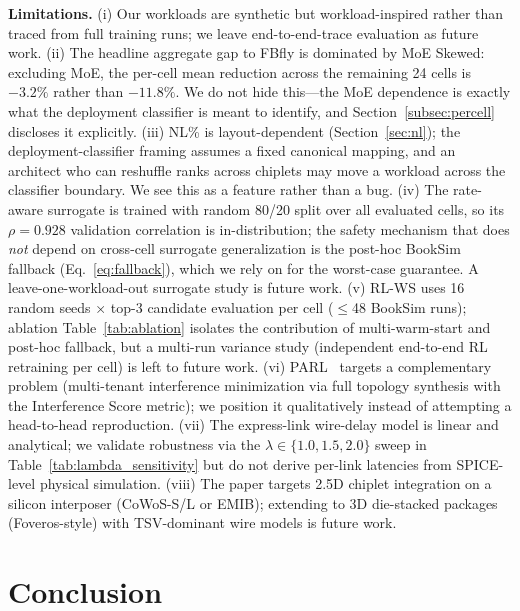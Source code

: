 \documentclass[conference]{IEEEtran}
\begin{document}
\textbf{Limitations.} (i) Our workloads are synthetic but workload-inspired rather than traced from full training runs; we leave end-to-end-trace evaluation as future work. (ii) The headline aggregate gap to FBfly is dominated by MoE Skewed: excluding MoE, the per-cell mean reduction across the remaining 24 cells is $-3.2\%$ rather than $-11.8\%$. We do not hide this---the MoE dependence is exactly what the deployment classifier is meant to identify, and Section~\ref{subsec:percell} discloses it explicitly. (iii) NL\% is layout-dependent (Section~\ref{sec:nl}); the deployment-classifier framing assumes a fixed canonical mapping, and an architect who can reshuffle ranks across chiplets may move a workload across the classifier boundary. We see this as a feature rather than a bug. (iv) The rate-aware surrogate is trained with random 80/20 split over all evaluated cells, so its $\rho{=}0.928$ validation correlation is in-distribution; the safety mechanism that does \textit{not} depend on cross-cell surrogate generalization is the post-hoc BookSim fallback (Eq.~\ref{eq:fallback}), which we rely on for the worst-case guarantee. A leave-one-workload-out surrogate study is future work. (v) RL-WS uses 16 random seeds × top-3 candidate evaluation per cell ($\le$48 BookSim runs); ablation Table~\ref{tab:ablation} isolates the contribution of multi-warm-start and post-hoc fallback, but a multi-run variance study (independent end-to-end RL retraining per cell) is left to future work. (vi) PARL~\cite{parl} targets a complementary problem (multi-tenant interference minimization via full topology synthesis with the Interference Score metric); we position it qualitatively instead of attempting a head-to-head reproduction. (vii) The express-link wire-delay model is linear and analytical; we validate robustness via the $\lambda\!\in\!\{1.0,1.5,2.0\}$ sweep in Table~\ref{tab:lambda_sensitivity} but do not derive per-link latencies from SPICE-level physical simulation. (viii) The paper targets 2.5D chiplet integration on a silicon interposer (CoWoS-S/L or EMIB); extending to 3D die-stacked packages (Foveros-style) with TSV-dominant wire models is future work.

\section{Conclusion}
\end{document}
